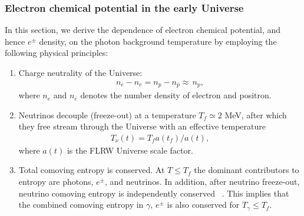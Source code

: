


\subsubsection{Electron chemical potential in the early Universe}
In this section, we derive the dependence of electron chemical potential, and hence $e^\pm$ density, on the photon background temperature by employing the following physical principles:
\begin{enumerate}
\item Charge neutrality of the Universe:
\begin{align}\label{neutrality}
n_e-n_{\overline{e}}=n_p-n_{\overline{p}}\approx\,n_p,
\end{align}
where $n_e$ and $n_{\overline{e}}$ denotes the number density of electron and positron.
\item Neutrinos decouple (freeze-out) at a temperature $T_f\simeq 2$ MeV, after which they free stream through the Universe with an effective temperature~\cite{Birrell:2012gg}
\begin{align}
T_\nu(t)=T_f a(t_f)/a(t),
\end{align}
 where $a(t)$ is the FLRW Universe scale factor.
\item Total comoving entropy is conserved. At $T\leq T_f$ the dominant contributors to entropy are photons, $e^\pm$, and neutrinos.
In addition, after neutrino freeze-out, neutrino comoving entropy is independently conserved ~\cite{Birrell:2012gg}. This  implies that the combined comoving entropy in $\gamma$, $e^\pm$ is also conserved for $T_\gamma\leq T_f$.
\end{enumerate}


